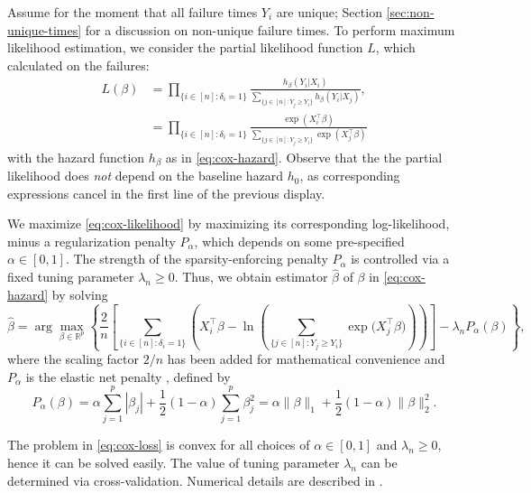\documentclass[11pt]{article}
\newcommand{\R}{\mathbb{R}}
\begin{document}
Assume for the moment that all failure times $Y_i$ are unique; Section \ref{sec:non-unique-times} for a discussion on non-unique failure times. To perform maximum likelihood estimation, we consider the partial likelihood function $L$, which calculated on the failures:
\begin{equation} \label{eq:cox-likelihood}
    \begin{split}
        L(\beta)
        &=
        \prod_{\{ i \in [n] : \delta_i = 1 \}}
        \frac{ h_\beta(Y_i | X_i) }{ \sum_{\{ j\in[n] : Y_j \geq Y_i \}} h_\beta(Y_i | X_j) },
        \\
        &=
        \prod_{\{ i \in [n] : \delta_i = 1 \}}
        \frac{ \exp(X_i^\top \beta) }{ \sum_{\{ j\in[n] : Y_j \geq Y_i \}} \exp(X_j^\top \beta) }
    \end{split}
\end{equation}
with the hazard function $h_\beta$ as in \eqref{eq:cox-hazard}. Observe that the the partial likelihood does \textit{not} depend on the baseline hazard $h_0$, as corresponding expressions cancel in the first line of the previous display. 

We maximize \eqref{eq:cox-likelihood} by maximizing its corresponding log-likelihood, minus a regularization penalty $P_\alpha$, which depends on some pre-specified $\alpha \in [0,1]$. The strength of the sparsity-enforcing penalty $P_\alpha$ is controlled via a fixed tuning parameter $\lambda_n \geq 0$. Thus, we obtain estimator $\widehat{\beta}$ of $\beta$ in \eqref{eq:cox-hazard} by solving
\begin{equation} \label{eq:cox-loss}
    \widehat{\beta} 
    =
    \arg\max_{\beta \in \R^p}
    \left\{
        \frac{2}{n}
        \left[
            \sum_{\{i\in[n]:\delta_i = 1\}}
            \left(
            X_i^\top \beta
            -
            \ln
            \left(
            \sum_{\{ j\in[n] : Y_j \geq Y_i \}}
            \exp
            \big(
            X_j^\top \beta
            \big)
            \right)
            \right)
        \right]
        -
        \lambda_n
        P_\alpha (\beta)
    \right\},
\end{equation}
where the scaling factor $2/n$ has been added for mathematical convenience and $P_\alpha$ is the elastic net penalty \citep{zou2005}, defined by
\[
    P_\alpha (\beta) = \alpha \sum_{j=1}^p |\beta_j| + \frac{1}{2} (1 - \alpha) \sum_{j=1}^p \beta_j^2
    =
    \alpha \|\beta \|_1 + \frac{1}{2} (1-\alpha) \|\beta \|_2^2.
\]

The problem in \eqref{eq:cox-loss} is convex for all choices of $\alpha \in [0,1]$ and $\lambda_n \geq 0$, hence it can be solved easily. The value of tuning parameter $\lambda_n$ can be determined via cross-validation. Numerical details are described in \cite{simon2011}.
\end{document}
